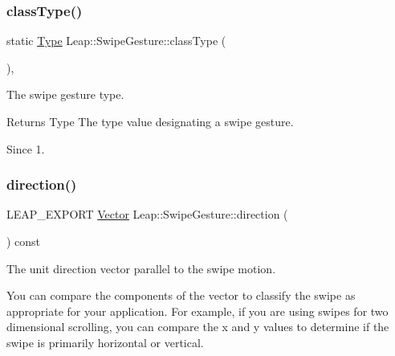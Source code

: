 \subsubsection{\texorpdfstring{class\+Type()}{classType()}}
{\footnotesize\ttfamily static \hyperlink{class_leap_1_1_gesture_a6fa6dd4f28c502f0d55abc6b71c6f9b1}{Type} Leap\+::\+Swipe\+Gesture\+::class\+Type (\begin{DoxyParamCaption}{ }\end{DoxyParamCaption})\hspace{0.3cm}{\ttfamily [inline]}, {\ttfamily [static]}}

The swipe gesture type.


\begin{DoxyCodeInclude}
\end{DoxyCodeInclude}


\begin{DoxyReturn}{Returns}
Type The type value designating a swipe gesture. 
\end{DoxyReturn}
\begin{DoxySince}{Since}
1. 
\end{DoxySince}
\mbox{\label{class_leap_1_1_swipe_gesture_aa1adb82cadcaa84121e3991b1a746b55}} 
\subsubsection{\texorpdfstring{direction()}{direction()}}
{\footnotesize\ttfamily L\+E\+A\+P\+\_\+\+E\+X\+P\+O\+RT \hyperlink{struct_leap_1_1_vector}{Vector} Leap\+::\+Swipe\+Gesture\+::direction (\begin{DoxyParamCaption}{ }\end{DoxyParamCaption}) const}

The unit direction vector parallel to the swipe motion.


\begin{DoxyCodeInclude}
\end{DoxyCodeInclude}


You can compare the components of the vector to classify the swipe as appropriate for your application. For example, if you are using swipes for two dimensional scrolling, you can compare the x and y values to determine if the swipe is primarily horizontal or vertical.

